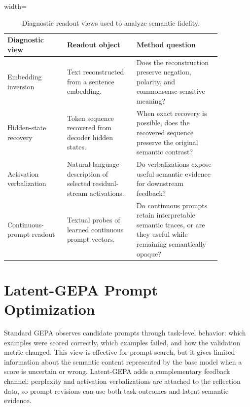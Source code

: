 \documentclass[12pt,a4paper,twoside,openright]{book}
\begin{document}
\begin{table}[!htb]
    \centering
    \small
    \begin{adjustbox}{width=\textwidth}
    \begin{tabular}{p{0.24\linewidth} p{0.28\linewidth} p{0.34\linewidth}}
        \toprule
        \textbf{Diagnostic view} & \textbf{Readout object} & \textbf{Method question} \\
        \midrule
        Embedding inversion & Text reconstructed from a sentence embedding. &
        Does the reconstruction preserve negation, polarity, and
        commonsense-sensitive meaning? \\
        Hidden-state recovery & Token sequence recovered from decoder hidden states. &
        When exact recovery is possible, does the recovered sequence preserve the
        original semantic contrast? \\
        Activation verbalization & Natural-language description of selected residual-stream activations. &
        Do verbalizations expose useful semantic evidence for downstream
        feedback? \\
        Continuous-prompt readout & Textual probes of learned continuous prompt vectors. &
        Do continuous prompts retain interpretable semantic traces, or are they
        useful while remaining semantically opaque? \\
        \bottomrule
    \end{tabular}
    \end{adjustbox}
    \caption{Diagnostic readout views used to analyze semantic fidelity.}
    \label{tab:semantic-readout-diagnostics}
\end{table}

\section{Latent-GEPA Prompt Optimization}
\label{sec:method-gepa-loop}

Standard GEPA observes candidate prompts through task-level behavior: which
examples were scored correctly, which examples failed, and how the validation
metric changed. This view is effective for prompt search, but it gives limited
information about the semantic content represented by the base model when a
score is uncertain or wrong. Latent-GEPA adds a complementary feedback channel:
perplexity and activation verbalizations are attached to the reflection data, so
prompt revisions can use both task outcomes and latent semantic evidence.
\end{document}
